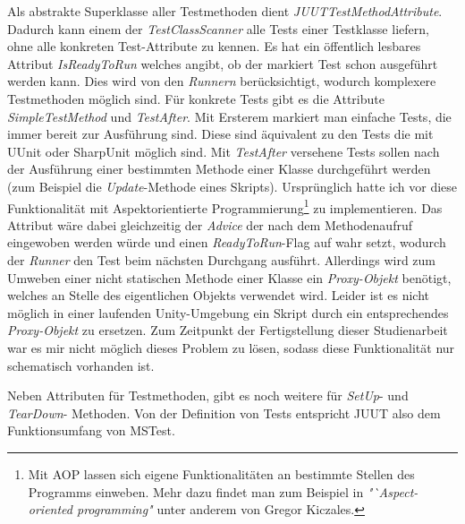 Als abstrakte Superklasse aller Testmethoden dient \textit{JUUTTestMethodAttribute}. Dadurch kann einem der \textit{TestClassScanner} alle Tests einer Testklasse liefern, ohne alle konkreten Test-Attribute zu kennen. Es hat ein öffentlich lesbares Attribut \textit{IsReadyToRun} welches angibt, ob der markiert Test schon ausgeführt werden kann. Dies wird von den \textit{Runnern} berücksichtigt, wodurch komplexere Testmethoden möglich sind. Für konkrete Tests gibt es die Attribute \textit{SimpleTestMethod} und \textit{TestAfter}. Mit Ersterem markiert man einfache Tests, die immer bereit zur Ausführung sind. Diese sind äquivalent zu den Tests die mit UUnit oder SharpUnit möglich sind. Mit \textit{TestAfter} versehene Tests sollen nach der Ausführung einer bestimmten Methode einer Klasse durchgeführt werden (zum Beispiel die \textit{Update}-Methode eines Skripts). Ursprünglich hatte ich vor diese Funktionalität mit Aspektorientierte Programmierung\footnote{Mit AOP lassen sich eigene Funktionalitäten an bestimmte Stellen des Programms einweben. Mehr dazu findet man zum Beispiel in \textit{"`Aspect-oriented programming"} unter anderem von Gregor Kiczales.} zu implementieren. Das Attribut wäre dabei gleichzeitig der \textit{Advice} der nach dem Methodenaufruf eingewoben werden würde und einen \textit{ReadyToRun}-Flag auf wahr setzt, wodurch der \textit{Runner} den Test beim nächsten Durchgang ausführt. Allerdings wird zum Umweben einer nicht statischen Methode einer Klasse ein \textit{Proxy-Objekt} benötigt, welches an Stelle des eigentlichen Objekts verwendet wird. Leider ist es nicht möglich in einer laufenden Unity-Umgebung ein Skript durch ein entsprechendes \textit{Proxy-Objekt} zu ersetzen. Zum Zeitpunkt der Fertigstellung dieser Studienarbeit war es mir nicht möglich dieses Problem zu lösen, sodass diese Funktionalität nur schematisch vorhanden ist.

Neben Attributen für Testmethoden, gibt es noch weitere für \textit{SetUp}- und \textit{TearDown}- Methoden. Von der Definition von Tests entspricht JUUT also dem Funktionsumfang von MSTest.

